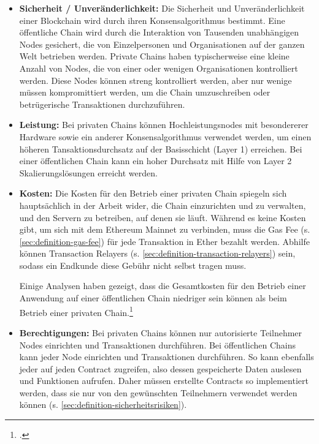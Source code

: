 \begin{itemize}
    \item \textbf{Sicherheit / Unveränderlichkeit:} 
    Die Sicherheit und Unveränderlichkeit einer Blockchain wird durch ihren Konsensalgorithmus bestimmt. 
    Eine öffentliche Chain wird durch die Interaktion von Tausenden unabhängigen Nodes gesichert, die von Einzelpersonen und Organisationen auf der ganzen Welt betrieben werden. 
    Private Chains haben typischerweise eine kleine Anzahl von Nodes, die von einer oder wenigen Organisationen kontrolliert werden. 
    Diese Nodes können streng kontrolliert werden, aber nur wenige müssen kompromittiert werden, um die Chain umzuschreiben oder betrügerische Transaktionen durchzuführen.

    \item \textbf{Leistung:} 
    Bei privaten Chains können Hochleistungsnodes mit besondererer Hardware sowie ein anderer Konsensalgorithmus verwendet werden, um einen höheren Tansaktionsdurchsatz auf der Basisschicht (Layer 1) erreichen.
    Bei einer öffentlichen Chain kann ein hoher Durchsatz mit Hilfe von Layer 2 Skalierungslösungen erreicht werden.

    \item  \textbf{Kosten:}
    Die Kosten für den Betrieb einer privaten Chain spiegeln sich hauptsächlich in der Arbeit wider, die Chain einzurichten und zu verwalten, und den Servern zu betreiben, auf denen sie läuft. 
    Während es keine Kosten gibt, um sich mit dem Ethereum Mainnet zu verbinden, muss die Gas Fee (s. \ref{sec:definition-gas-fee}) für jede Transaktion in Ether bezahlt werden.
    Abhilfe können Transaction Relayers (s. \ref{sec:definition-transaction-relayers}) sein, sodass ein Endkunde diese Gebühr nicht selbst tragen muss.

    Einige Analysen haben gezeigt, dass die Gesamtkosten für den Betrieb einer Anwendung auf einer öffentlichen Chain niedriger sein können als beim Betrieb einer privaten Chain.\footcite[Vgl.][14]{q6}

    \item \textbf{Berechtigungen:}
    Bei privaten Chains können nur autorisierte Teilnehmer Nodes einrichten und Transaktionen durchführen.
    Bei öffentlichen Chains kann jeder Node einrichten und Transaktionen durchführen.
    So kann ebenfalls jeder auf jeden Contract zugreifen, also dessen gespeicherte Daten auslesen und Funktionen aufrufen.
    Daher müssen erstellte Contracts so implementiert werden, dass sie nur von den gewünschten Teilnehmern verwendet werden können (s. \ref{sec:definition-sicherheitsrisiken}).


\end{itemize}
